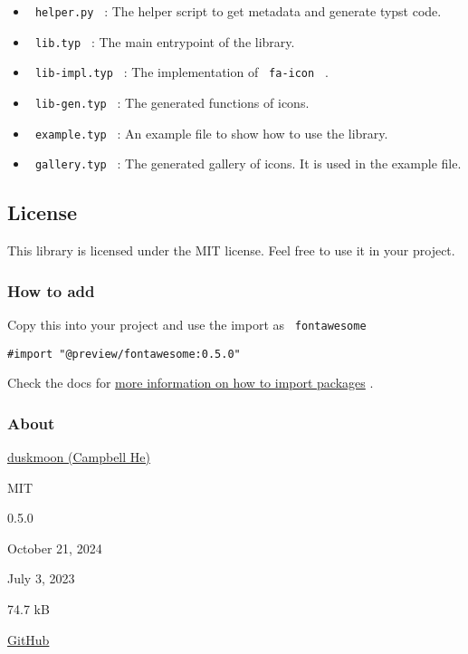 \begin{itemize}
\tightlist
\item
  \texttt{\ helper.py\ } : The helper script to get metadata and
  generate typst code.
\item
  \texttt{\ lib.typ\ } : The main entrypoint of the library.
\item
  \texttt{\ lib-impl.typ\ } : The implementation of \texttt{\ fa-icon\ }
  .
\item
  \texttt{\ lib-gen.typ\ } : The generated functions of icons.
\item
  \texttt{\ example.typ\ } : An example file to show how to use the
  library.
\item
  \texttt{\ gallery.typ\ } : The generated gallery of icons. It is used
  in the example file.
\end{itemize}

\subsection{License}\label{license}

This library is licensed under the MIT license. Feel free to use it in
your project.

\subsubsection{How to add}\label{how-to-add}

Copy this into your project and use the import as
\texttt{\ fontawesome\ }

\begin{verbatim}
#import "@preview/fontawesome:0.5.0"
\end{verbatim}



Check the docs for
\href{https://typst.app/docs/reference/scripting/\#packages}{more
information on how to import packages} .

\subsubsection{About}\label{about}

\begin{description}
\tightlist
\item[Author :]
\href{mailto:kp.campbell.he@duskmoon314.com}{duskmoon (Campbell He)}
\item[License:]
MIT
\item[Current version:]
0.5.0
\item[Last updated:]
October 21, 2024
\item[First released:]
July 3, 2023
\item[Archive size:]
74.7 kB
\href{https://packages.typst.org/preview/fontawesome-0.5.0.tar.gz}{\pandocbounded{}}
\item[Repository:]
\href{https://github.com/duskmoon314/typst-fontawesome}{GitHub}
\end{description}


